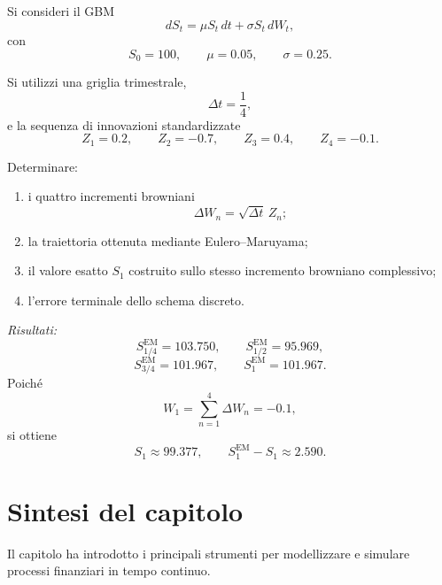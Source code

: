 \begin{exercise}
\label{ex:cap06-proposto-traiettoria-eulero}

Si consideri il GBM
\[
dS_t
=
\mu S_t\,dt+\sigma S_t\,dW_t,
\]
con
\[
S_0=100,
\qquad
\mu=0.05,
\qquad
\sigma=0.25.
\]

Si utilizzi una griglia trimestrale,
\[
\Delta t=\frac{1}{4},
\]
e la sequenza di innovazioni standardizzate
\[
Z_1=0.2,
\qquad
Z_2=-0.7,
\qquad
Z_3=0.4,
\qquad
Z_4=-0.1.
\]

Determinare:

\begin{enumerate}
\item i quattro incrementi browniani
\[
\Delta W_n=\sqrt{\Delta t}\,Z_n;
\]
\item la traiettoria ottenuta mediante Eulero--Maruyama;
\item il valore esatto $S_1$ costruito sullo stesso incremento
browniano complessivo;
\item l'errore terminale dello schema discreto.
\end{enumerate}

\end{exercise}

\noindent
\textit{Risultati:}
\[
S_{1/4}^{\mathrm{EM}}=103.750,
\qquad
S_{1/2}^{\mathrm{EM}}=95.969,
\]
\[
S_{3/4}^{\mathrm{EM}}=101.967,
\qquad
S_1^{\mathrm{EM}}=101.967.
\]
Poich\'{e}
\[
W_1
=
\sum_{n=1}^{4}\Delta W_n
=
-0.1,
\]
si ottiene
\[
S_1\approx99.377,
\qquad
S_1^{\mathrm{EM}}-S_1\approx2.590.
\]

\section{Sintesi del capitolo}
\label{sec:cap06-sintesi}

Il capitolo ha introdotto i principali strumenti per modellizzare e
simulare processi finanziari in tempo continuo.

